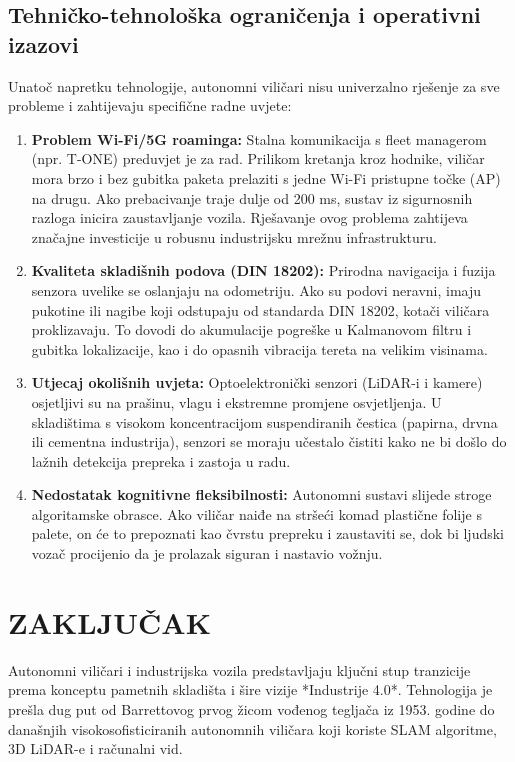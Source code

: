 \documentclass[12pt,a4paper]{article}
\begin{document}
\subsection{Tehničko-tehnološka ograničenja i operativni izazovi}
Unatoč napretku tehnologije, autonomni viličari nisu univerzalno rješenje za sve probleme i zahtijevaju specifične radne uvjete:
\begin{enumerate}
    \item \textbf{Problem Wi-Fi/5G roaminga:} Stalna komunikacija s fleet managerom (npr. T-ONE) preduvjet je za rad. Prilikom kretanja kroz hodnike, viličar mora brzo i bez gubitka paketa prelaziti s jedne Wi-Fi pristupne točke (AP) na drugu. Ako prebacivanje traje dulje od 200 ms, sustav iz sigurnosnih razloga inicira zaustavljanje vozila. Rješavanje ovog problema zahtijeva značajne investicije u robusnu industrijsku mrežnu infrastrukturu.
    \item \textbf{Kvaliteta skladišnih podova (DIN 18202):} Prirodna navigacija i fuzija senzora uvelike se oslanjaju na odometriju. Ako su podovi neravni, imaju pukotine ili nagibe koji odstupaju od standarda DIN 18202, kotači viličara proklizavaju. To dovodi do akumulacije pogreške u Kalmanovom filtru i gubitka lokalizacije, kao i do opasnih vibracija tereta na velikim visinama.
    \item \textbf{Utjecaj okolišnih uvjeta:} Optoelektronički senzori (LiDAR-i i kamere) osjetljivi su na prašinu, vlagu i ekstremne promjene osvjetljenja. U skladištima s visokom koncentracijom suspendiranih čestica (papirna, drvna ili cementna industrija), senzori se moraju učestalo čistiti kako ne bi došlo do lažnih detekcija prepreka i zastoja u radu.
    \item \textbf{Nedostatak kognitivne fleksibilnosti:} Autonomni sustavi slijede stroge algoritamske obrasce. Ako viličar naiđe na stršeći komad plastične folije s palete, on će to prepoznati kao čvrstu prepreku i zaustaviti se, dok bi ljudski vozač procijenio da je prolazak siguran i nastavio vožnju.
\end{enumerate}

\section{ZAKLJUČAK}
Autonomni viličari i industrijska vozila predstavljaju ključni stup tranzicije prema konceptu pametnih skladišta i šire vizije *Industrije 4.0*. Tehnologija je prešla dug put od Barrettovog prvog žicom vođenog tegljača iz 1953. godine do današnjih visokosofisticiranih autonomnih viličara koji koriste SLAM algoritme, 3D LiDAR-e i računalni vid.
\end{document}
